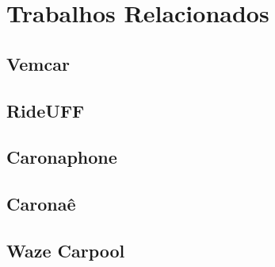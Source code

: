 \chapter{Trabalhos Relacionados}

\section{Vemcar}
\section{RideUFF}
\section{Caronaphone}
\section{Caronaê}
\section{Waze Carpool}	
